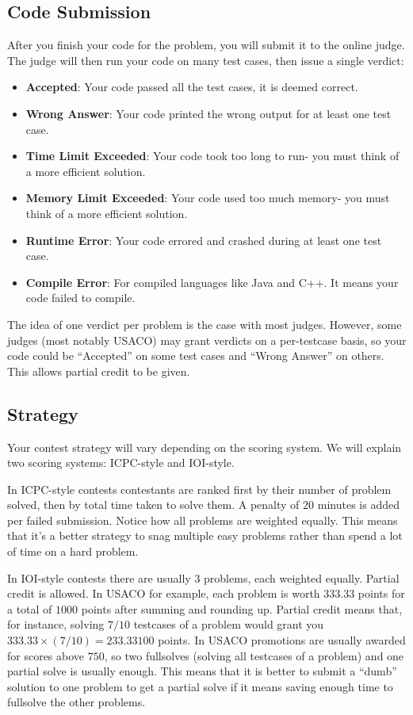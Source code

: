 \documentclass{article}
\begin{document}
\subsection{Code Submission}
After you finish your code for the problem, you will submit it to the online judge. The judge will then run your code on many test cases, then issue a single verdict:
\begin{itemize}
    \item \textbf{Accepted}: Your code passed all the test cases, it is deemed correct.
    \item \textbf{Wrong Answer}: Your code printed the wrong output for at least one test case.
    \item \textbf{Time Limit Exceeded}: Your code took too long to run- you must think of a more efficient solution.
    \item \textbf{Memory Limit Exceeded}: Your code used too much memory- you must think of a more efficient solution.
    \item \textbf{Runtime Error}: Your code errored and crashed during at least one test case.
    \item \textbf{Compile Error}: For compiled languages like Java and C++. It means your code failed to compile.
\end{itemize}
The idea of one verdict per problem is the case with most judges. However, some judges (most notably USACO) may grant verdicts on a per-testcase basis, so your code could be ``Accepted'' on some test cases and ``Wrong Answer'' on others. This allows partial credit to be given.

\subsection {Strategy}

Your contest strategy will vary depending on the scoring system. We will explain two scoring systems: ICPC-style and IOI-style.

In ICPC-style contests contestants are ranked first by their number of problem solved, then by total time taken to solve them. A penalty of $20$ minutes is added per failed submission. Notice how all problems are weighted equally. This means that it's a better strategy to snag multiple easy problems rather than spend a lot of time on a hard problem.

In IOI-style contests there are usually 3 problems, each weighted equally. Partial credit is allowed. In USACO for example, each problem is worth $333.33$ points for a total of $1000$ points after summing and rounding up. Partial credit means that, for instance, solving $7/10$ testcases of a problem would grant you $333.33\times (7/10) = 233.33100$ points. In USACO promotions are usually awarded for scores above $750$, so two fullsolves (solving all testcases of a problem) and one partial solve is usually enough. This means that it is better to submit a ``dumb'' solution to one problem to get a partial solve if it means saving enough time to fullsolve the other problems.
\end{document}
